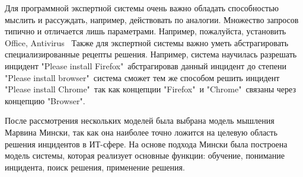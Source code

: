 Для программной экспертной системы очень важно обладать способностью мыслить и рассуждать, например, действовать по аналогии. Множество запросов типично и отличается лишь параметрами. Например, пожалуйста, установить Office, Antivirus \etc\ Также для экспертной системы важно уметь абстрагировать специализированные рецепты решения. Например, система научилась разрешать инцидент "Please install Firefox"\comma\ абстрагировав данный инцидент до степени "Please install browser"\comma\ система сможет тем же способом решить инцидент "Please install Chrome"\comma\ так как концепции "Firefox"\ и "Chrome"\ связаны через концепцию "Browser". \par
После рассмотрения нескольких моделей была выбрана модель мышления Марвина Мински, так как она наиболее точно ложится на целевую область решения инцидентов в ИТ-сфере. На основе подхода Мински была построена модель системы, которая реализует основные функции: обучение, понимание инцидента, поиск решения, применение решения. 


